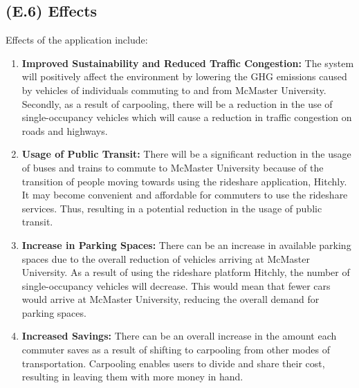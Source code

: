 \documentclass[12pt,letterpaper]{article}
\begin{document}
\subsection{(E.6) Effects}
Effects of the application include:
\begin{enumerate}
\item \textbf{Improved Sustainability and Reduced Traffic Congestion:} The system will positively affect the environment by lowering the GHG emissions caused by vehicles of individuals commuting to and from McMaster University. Secondly, as a result of carpooling, there will be a reduction in the use of single-occupancy vehicles which will cause a reduction in traffic congestion on roads and highways. 
\item \textbf{Usage of Public Transit:} There will be a significant reduction in the usage of buses and trains to commute to McMaster University because of the transition of people moving towards using the rideshare application, Hitchly. It may become convenient and affordable for commuters to use the rideshare services. Thus, resulting in a potential reduction in the usage of public transit.  
\item \textbf{Increase in Parking Spaces:} There can be an increase in available parking spaces due to the overall reduction of vehicles arriving at McMaster University. As a result of using the rideshare platform Hitchly, the number of single-occupancy vehicles will decrease. This would mean that fewer cars would arrive at McMaster University, reducing the overall demand for parking spaces.
\item \textbf{Increased Savings:} There can be an overall increase in the amount each commuter saves as a result of shifting to carpooling from other modes of transportation. Carpooling enables users to divide and share their cost, resulting in leaving them with more money in hand. 
\end{enumerate}
\end{document}
